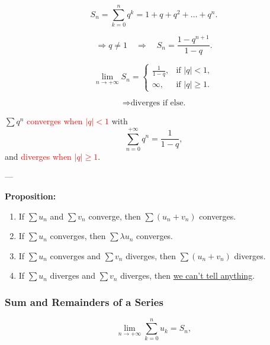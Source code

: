 \documentclass[a4paper,12pt]{article}
\begin{document}
\bigskip

\[
S_n = \sum_{k=0}^n q^k = 1 + q + q^2 + \dots + q^n.
\]

\[
\Rightarrow q \neq 1 \quad \Rightarrow \quad 
S_n = \frac{1 - q^{n+1}}{1-q}.
\]

\[
\lim_{n \to +\infty} S_n =
\begin{cases}
\frac{1}{1-q}, & \text{if } |q| < 1, \\[6pt]
\infty, & \text{if } |q| \geq 1.
\end{cases}
\]

\[
\Rightarrow \text{diverges if else.}
\]

\begin{tcolorbox}[colback=red!5!white,colframe=red!100!black,title=\textcolor{black}{Conclusion}]
$\sum q^n$ \textcolor{red}{converges when $|q| < 1$} with
\[
\sum_{n=0}^{+\infty} q^n = \frac{1}{1-q},
\]
and \textcolor{red}{diverges when $|q| \geq 1$}.
\end{tcolorbox}

---

\textbf{Proposition:} \bigskip


\bigskip

\begin{enumerate}
  \item If $\sum u_n$ and $\sum v_n$ converge, then $\sum (u_n + v_n)$ converges.
  \item If $\sum u_n$ converges, then $\sum \lambda u_n$ converges.
  \item If $\sum u_n$ converges and $\sum v_n$ diverges, then $\sum (u_n+v_n)$ diverges.
  \item If $\sum u_n$ diverges and $\sum v_n$ diverges, then \underline{we can’t tell anything}.
\end{enumerate}

\newpage
\subsubsection*{Sum and Remainders of a Series}

 \bigskip

  \[
  \lim_{n \to +\infty} \sum_{k=0}^n u_k = S_n,
  \]
\end{document}
